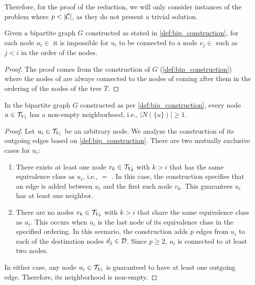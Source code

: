 Therefore, for the proof of the reduction, we will only consider instances of the problem where $p < |\mathcal{C}|$, as they do not present a trivial solution.

\begin{lemma} \label{lemma:greater_nodes}
    Given a bipartite graph $G$ constructed as stated in \cref{def:bip_construction}, for each node $u_i \in$  it is impossible for $u_i$ to be connected to a node $v_j \in$  such as $j < i$ in the order of the nodes.
\end{lemma}

\begin{proof}
    The proof comes from the construction of $G$ (\cref{def:bip_construction}) where the nodes of  are always connected to the nodes of  coming after them in the ordering of the nodes of the tree $T$.
\end{proof}

\begin{claim} \label{claim:node_connectivity}
    In the bipartite graph $G$ constructed as per \cref{def:bip_construction}, every node $u \in \mathcal{T}_{V_1}$ has a non-empty neighborhood, i.e., $|N(\{u\})| \geq 1$.
\end{claim}
\begin{proof}
    Let $u_i \in \mathcal{T}_{V_1}$ be an arbitrary node. We analyze the construction of its outgoing edges based on \cref{def:bip_construction}. There are two mutually exclusive cases for $u_i$:
    \begin{enumerate}
        \item There exists at least one node $v_k \in \mathcal{T}_{V_2}$ with $k > i$ that has the same equivalence class as $u_i$, i.e.,  $=$ . In this case, the construction specifies that an edge is added between $u_i$ and the first such node $v_k$. This guarantees $u_i$ has at least one neighbor.
        \item There are no nodes $v_k \in \mathcal{T}_{V_2}$ with $k > i$ that share the same equivalence class as $u_i$. This occurs when $u_i$ is the last node of its equivalence class in the specified ordering. In this scenario, the construction adds $p$ edges from $u_i$ to each of the destination nodes $d_j \in \mathcal{D}$. Since $p \geq 2$, $u_i$ is connected to at least two nodes.
    \end{enumerate}
    In either case, any node $u_i \in \mathcal{T}_{V_1}$ is guaranteed to have at least one outgoing edge. Therefore, its neighborhood is non-empty.
\end{proof}

